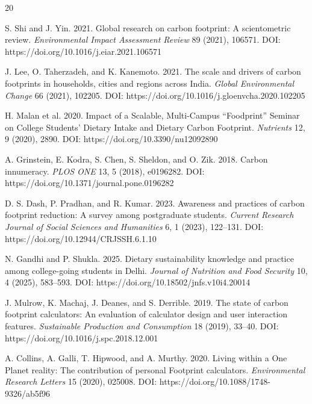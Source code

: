 \documentclass[12pt, a4paper]{article}
\begin{document}
\begin{thebibliography}{20}
\footnotesize

S. Shi and J. Yin. 2021. Global research on carbon footprint: A scientometric review. \textit{Environmental Impact Assessment Review} 89 (2021), 106571. DOI: https://doi.org/10.1016/j.eiar.2021.106571

J. Lee, O. Taherzadeh, and K. Kanemoto. 2021. The scale and drivers of carbon footprints in households, cities and regions across India. \textit{Global Environmental Change} 66 (2021), 102205. DOI: https://doi.org/10.1016/j.gloenvcha.2020.102205

H. Malan et al. 2020. Impact of a Scalable, Multi-Campus ``Foodprint'' Seminar on College Students' Dietary Intake and Dietary Carbon Footprint. \textit{Nutrients} 12, 9 (2020), 2890. DOI: https://doi.org/10.3390/nu12092890

A. Grinstein, E. Kodra, S. Chen, S. Sheldon, and O. Zik. 2018. Carbon innumeracy. \textit{PLOS ONE} 13, 5 (2018), e0196282. DOI: https://doi.org/10.1371/journal.pone.0196282

D. S. Dash, P. Pradhan, and R. Kumar. 2023. Awareness and practices of carbon footprint reduction: A survey among postgraduate students. \textit{Current Research Journal of Social Sciences and Humanities} 6, 1 (2023), 122--131. DOI: https://doi.org/10.12944/CRJSSH.6.1.10

N. Gandhi and P. Shukla. 2025. Dietary sustainability knowledge and practice among college-going students in Delhi. \textit{Journal of Nutrition and Food Security} 10, 4 (2025), 583--593. DOI: https://doi.org/10.18502/jnfs.v10i4.20014

J. Mulrow, K. Machaj, J. Deanes, and S. Derrible. 2019. The state of carbon footprint calculators: An evaluation of calculator design and user interaction features. \textit{Sustainable Production and Consumption} 18 (2019), 33--40. DOI: https://doi.org/10.1016/j.spc.2018.12.001

A. Collins, A. Galli, T. Hipwood, and A. Murthy. 2020. Living within a One Planet reality: The contribution of personal Footprint calculators. \textit{Environmental Research Letters} 15 (2020), 025008. DOI: https://doi.org/10.1088/1748-9326/ab5f96


\end{thebibliography}
\end{document}
